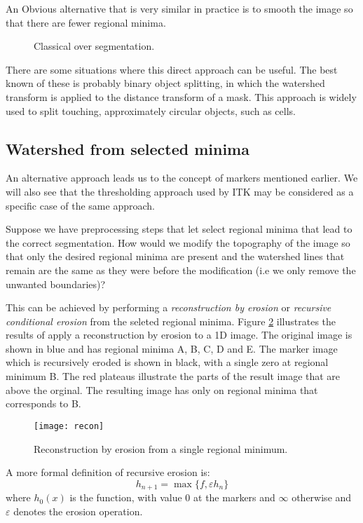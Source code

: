 \documentclass{InsightArticle}
\begin{document}
An Obvious alternative that is very similar in practice is to 
smooth the image so that there are fewer regional minima.
\begin{figure}
\begin{center}
\label{fig:overseg}
\caption{Classical over segmentation.}
\end{center}
\end{figure}

There are some situations where this direct approach can be
useful. The best known of these is probably binary object splitting,
in which the watershed transform is applied to the distance transform
of a mask. This approach is widely used to split touching,
approximately circular objects, such as cells.

\subsection{Watershed from selected minima}
An alternative approach leads us to the concept of markers mentioned
earlier. We will also see that the thresholding approach used by ITK
may be considered as a specific case of the same approach.

Suppose we have preprocessing steps that let select regional minima
that lead to the correct segmentation. How would we modify the
topography of the image so that only the desired regional minima are
present and the watershed lines that remain are the same as they were
before the modification (i.e we only remove the unwanted boundaries)?

This can be achieved by performing a {\em reconstruction by erosion}
or {\em recursive conditional erosion} from the seleted regional
minima. Figure \ref{fig:recon} illustrates the results of apply a
reconstruction by erosion to a 1D image. The original image is shown
in blue and has regional minima A, B, C, D and E. The marker image
which is recursively eroded is shown in black, with a single zero at
regional minimum B. The red plateaus illustrate the parts of the
result image that are above the orginal. The resulting image has only
on regional minima that corresponds to B.
\begin{figure}[htbp]
\begin{center}
\texttt{[image: recon]}
\label{fig:recon}
\caption{Reconstruction by erosion from a single regional minimum.}
\end{center}
\end{figure}

A more formal definition of recursive erosion is:
\begin{equation}
\label{eq:recon_erosion}
h_{n+1}=\max\{f, \varepsilon h_n\}
\end{equation}
where $h_0(x)$ is the function, with value 0 at the markers and
$\infty$ otherwise and $\varepsilon$ denotes the erosion
operation.
\end{document}
